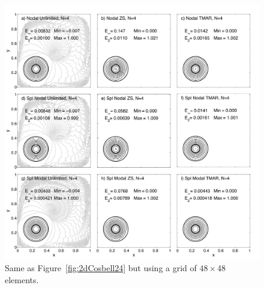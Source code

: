 \documentclass{ametsoc}
\begin{document}
\begin{figure} 
\includegraphics[width=\textwidth]{figs/2d/_defCosbell_9pan_48e.pdf}
\caption{Same as Figure~\ref{fig:2dCosbell24} but using a grid of $48\times48$ elements.}\label{fig:2dCosbell48}
\end{figure}
\end{document}
